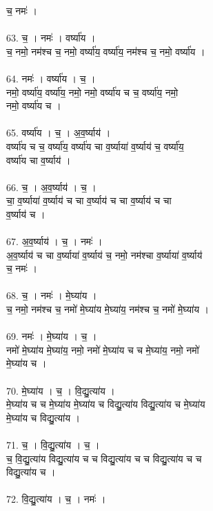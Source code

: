 च॒ नमः॑ ।\\
\\
63. च॒ । नमः॑ । वर्ष्या॑य ।\\
च॒ नमो॒ नम॑श्च च॒ नमो॒ वर्ष्या॑य॒ वर्ष्या॑य॒ नम॑श्च च॒ नमो॒ वर्ष्या॑य ।\\
\\
64. नमः॑ । वर्ष्या॑य । च॒ ।\\
नमो॒ वर्ष्या॑य॒ वर्ष्या॑य॒ नमो॒ नमो॒ वर्ष्या॑य च च॒ वर्ष्या॑य॒ नमो॒\\
नमो॒ वर्ष्या॑य च ।\\
\\
65. वर्ष्या॑य । च॒ । अ॒व॒र्ष्याय॑ ।\\
वर्ष्या॑य च च॒ वर्ष्या॑य॒ वर्ष्या॑य चा व॒र्ष्याया॑ व॒र्ष्याय॑ च॒ वर्ष्या॑य॒\\
वर्ष्या॑य चा व॒र्ष्याय॑ ।\\
\\
66. च॒ । अ॒व॒र्ष्याय॑ । च॒ ।\\
चा॒ व॒र्ष्याया॑ व॒र्ष्याय॑ च चा व॒र्ष्याय॑ च चा व॒र्ष्याय॑ च चा\\
व॒र्ष्याय॑ च ।\\
\\
67. अ॒व॒र्ष्याय॑ । च॒ । नमः॑ ।\\
अ॒व॒र्ष्याय॑ च चा व॒र्ष्याया॑ व॒र्ष्याय॑ च॒ नमो॒ नम॑श्चा व॒र्ष्याया॑ व॒र्ष्याय॑\\
च॒ नमः॑ ।\\
\\
68. च॒ । नमः॑ । मे॒घ्या॑य ।\\
च॒ नमो॒ नम॑श्च च॒ नमो॑ मे॒घ्या॑य मे॒घ्या॑य॒ नम॑श्च च॒ नमो॑ मे॒घ्या॑य ।\\
\\
69. नमः॑ । मे॒घ्या॑य । च॒ ।\\
नमो॑ मे॒घ्या॑य मे॒घ्या॑य॒ नमो॒ नमो॑ मे॒घ्या॑य च च मे॒घ्या॑य॒ नमो॒ नमो॑\\
मे॒घ्या॑य च ।\\
\\
70. मे॒घ्या॑य । च॒ । वि॒द्यु॒त्या॑य ।\\
मे॒घ्या॑य च च मे॒घ्या॑य मे॒घ्या॑य च विद्यु॒त्या॑य विद्यु॒त्या॑य च मे॒घ्या॑य\\
मे॒घ्या॑य च विद्यु॒त्या॑य ।\\
\\
71. च॒ । वि॒द्यु॒त्या॑य । च॒ ।\\
च॒ वि॒द्यु॒त्या॑य विद्यु॒त्या॑य च च विद्यु॒त्या॑य च च विद्यु॒त्या॑य च च\\
विद्यु॒त्या॑य च ।\\
\\
72. वि॒द्यु॒त्या॑य । च॒ । नमः॑ ।\\
